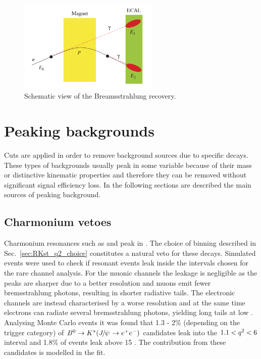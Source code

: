 \begin{figure}[t!]
\label{bremreco}
\centering
\includegraphics[width=0.6\textwidth]{RKst/figs/brem_recovery.png}
\caption{Schematic view of the Breamsstrahlung recovery. }
\end{figure}


\section{Peaking backgrounds }

Cuts are applied in order to remove background sources due to specific decays.
These types of backgrounds usually peak in some variable because of their mass
or distinctive kinematic properties and therefore they can be removed without significant
signal efficiency loss. In the following sections are described the main sources of peaking background.

\subsection{Charmonium vetoes}

Charmonium resonances such as \jpsi and \psitwos peak in \qsq.
The choice of \qsq binning described in Sec.~\ref{sec:RKst_q2_choice}
constitutes a natural veto for these decays. Simulated events were used
to check if resonant events leak inside the \qsq intervals chosen for
the rare channel analysis. For the muonic channels the leakage is negligible
as the peaks are sharper due to a better resolution and muons emit fewer
bremsstrahlung photons, resulting in shorter radiative tails.
The electronic channels are instead  characterised by
a worse resolution and at the same time electrons can radiate 
several bremsstrahlung photons, yielding long tails at low \qsq.
Analysing Monte Carlo events it was found that 1.3 - 2\% (depending on
the trigger category) of $\Bz\to\Kstar(\jpsi\to\ee)$ candidates leak into the $1.1 < {q^2} < 6$
\gevgevcccc interval and 1.8\% of \psitwos events leak above 15 \gevgevcccc.
The contribution from these candidates is modelled in the fit. 

